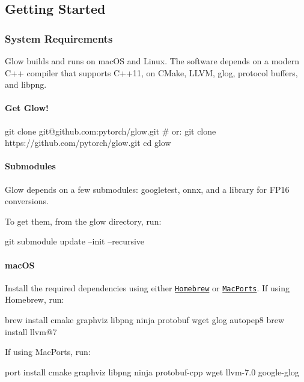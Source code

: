 \subsection*{Getting Started}

\subsubsection*{System Requirements}

Glow builds and runs on mac\+OS and Linux. The software depends on a modern C++ compiler that supports C++11, on C\+Make, L\+L\+VM, glog, protocol buffers, and libpng.

\paragraph*{Get Glow!}


\begin{DoxyCode}
git clone git@github.com:pytorch/glow.git  # or: git clone https://github.com/pytorch/glow.git
cd glow
\end{DoxyCode}


\paragraph*{Submodules}

Glow depends on a few submodules\+: googletest, onnx, and a library for F\+P16 conversions.

To get them, from the glow directory, run\+:


\begin{DoxyCode}
git submodule update --init --recursive
\end{DoxyCode}


\paragraph*{mac\+OS}

Install the required dependencies using either \href{https://brew.sh/}{\tt Homebrew} or \href{https://www.macports.org/}{\tt Mac\+Ports}. If using Homebrew, run\+:


\begin{DoxyCode}
brew install cmake graphviz libpng ninja protobuf wget glog autopep8
brew install llvm@7
\end{DoxyCode}


If using Mac\+Ports, run\+:


\begin{DoxyCode}
port install cmake graphviz libpng ninja protobuf-cpp wget llvm-7.0 google-glog
\end{DoxyCode}


